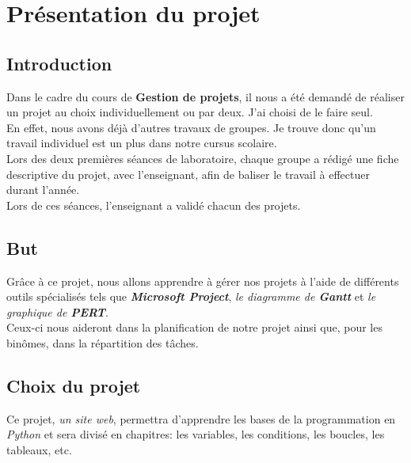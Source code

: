 \section{Présentation du projet}
\label{sec:presentation}


\subsection{Introduction}
\label{subsec:intro}

Dans le cadre du cours de \textbf{Gestion de projets}, il nous a été demandé de réaliser un projet au choix individuellement ou par deux. J'ai choisi de le faire seul. \\
En effet, nous avons déjà d'autres travaux de groupes. Je trouve donc qu'un travail individuel est un plus dans notre cursus scolaire. \\
Lors des deux premières séances de laboratoire, chaque groupe a rédigé une fiche descriptive du projet, avec l’enseignant, afin de baliser le travail à effectuer durant l’année.\\
Lors de ces séances, l’enseignant a validé chacun des projets.


\subsection{But}
\label{subsec:but}

Grâce à ce projet, nous allons apprendre à gérer nos projets à l'aide de différents outils spécialisés tels que \textbf{\textit{Microsoft Project}}, \textit{le diagramme de \textbf{Gantt}} et \textit{le graphique de \textbf{PERT}}.\\
Ceux-ci nous aideront dans la planification de notre projet ainsi que, pour les binômes, dans la répartition des tâches. 


\subsection{Choix du projet}
\label{subsec:choix}

Ce projet, \textit{un site web}, permettra d'apprendre les bases de la programmation en \textit{Python} et sera divisé en chapitres: les variables, les conditions, les boucles, les tableaux, etc.\\

